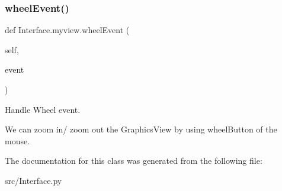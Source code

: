 \subsubsection{\texorpdfstring{wheelEvent()}{wheelEvent()}}
{\footnotesize\ttfamily def Interface.\+myview.\+wheel\+Event (\begin{DoxyParamCaption}\item[{}]{self,  }\item[{}]{event }\end{DoxyParamCaption})}



Handle Wheel event. 

\begin{DoxyVerb}We can zoom in/ zoom out the GraphicsView by using wheelButton of the mouse.
\end{DoxyVerb}
 

The documentation for this class was generated from the following file\+:\begin{DoxyCompactItemize}
\item 
src/Interface.\+py\end{DoxyCompactItemize}
